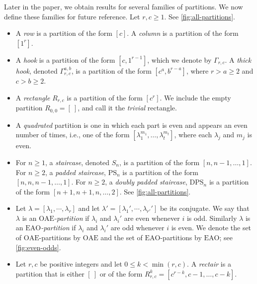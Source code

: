 \documentclass[pdflatex,sn-mathphys-num]{sn-jnl}%
\theoremstyle{thmstyleone}%
\theoremstyle{thmstyletwo}%
\theoremstyle{thmstylethree}%
\newcommand{\dps}{\mathrm{DPS}}
\newcommand{\ps}{\mathrm{PS}}
\newcommand{\s}{S}
\newcommand{\OAE}{\mathrm{OAE}}
\newcommand{\EAO}{\mathrm{EAO}}
\begin{document}
Later in the paper, we obtain results for several families of partitions. We now define these families for future reference.  Let $r, c \geq 1$. See \cref{fig:all-partitions}. 
    \begin{itemize}
        \item \label{def:rowcol}
     A \emph{row} is a partition of the form $[c]$. A \emph{column} is a partition of the form $[1^r]$. \label{def:hook}
   \item A \emph{hook} is a partition of the form $[c, 1^{r-1}]$, which we denote by $\Gamma_{r, c}$. 
     A \emph{thick hook}, denoted $\Gamma_{r,c}^{a, b}$, is a partition of the form $[c^a,b^{r-a}]$, where 
     $r > a \geq 2$ and $c > b \geq 2$. 

\item \label{def:rectangle}
   A \emph{rectangle} $R_{r,c}$ is a partition of the form $[c^r]$.
    We include the empty partition $R_{0,0}=[\ ]$, and call it the \emph{trivial} rectangle.
 
    \item 
     \label{def:quadrated}
      A \emph{quadrated} partition is one in which each part is even and appears an even number of times, i.e., one of the form $[\lambda_1^{m_1}, \ldots, \lambda_t^{m_t}]$, where each $\lambda_j$ and $m_j$ is even. 
  \item \label{def:staircase}
  For $n \geq 1$, a \emph{staircase}, denoted $\s_n$, is a partition of the form $[n, n-1, \ldots, 1]$. For $n \geq 2$, a \emph{padded staircase}, $\ps_n$ is a partition of the form $[n, n, n-1, \dots, 1]$. For $n \geq 2$, a \emph{doubly padded staircase}, $\dps_n$ is a partition of the form $[n+1, n+1, n, \ldots, 2]$. See \cref{fig:all-partitions}.   
  \item Let $\lambda = [\lambda_1, \cdots, \lambda_r]$ and let $\lambda' = [\lambda_1', \cdots, \lambda_{r'}']$ be its conjugate. We say that $\lambda$ is an \emph{$\OAE$-partition} if $\lambda_i$ and $\lambda_i'$ are even whenever $i$ is odd. Similarly $\lambda$ is an \emph{$\EAO$-partition} if $\lambda_i$ and $\lambda_i'$ are odd whenever $i$ is even. We denote the set of $\OAE$-partitions by $\OAE$ and the set of $\EAO$-partitions by $\EAO$; see \cref{fig:even-odds}.
  \item Let $r, c$ be positive integers and let $0 \leq k < \min(r, c)$. A \emph{rectair} is a partition that is either $[ \ ]$ or of the form $R^k_{r, c} = [c^{r-k}, c-1, \ldots, c-k]$.  

  
    \end{itemize}
    
\end{document}
